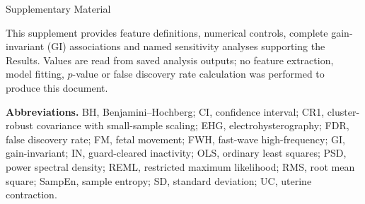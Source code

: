 \documentclass[10pt]{article}
\begin{document}
\begin{center}{\Large Supplementary Material}\par{}\end{center}
This supplement provides feature definitions, numerical controls, complete gain-invariant (GI) associations and named sensitivity analyses supporting the Results. Values are read from saved analysis outputs; no feature extraction, model fitting, $p$-value or false discovery rate calculation was performed to produce this document.

\noindent\textbf{Abbreviations.} BH, Benjamini--Hochberg; CI, confidence interval; CR1, cluster-robust covariance with small-sample scaling; EHG, electrohysterography; FDR, false discovery rate; FM, fetal movement; FWH, fast-wave high-frequency; GI, gain-invariant; IN, guard-cleared inactivity; OLS, ordinary least squares; PSD, power spectral density; REML, restricted maximum likelihood; RMS, root mean square; SampEn, sample entropy; SD, standard deviation; UC, uterine contraction.
\end{document}
